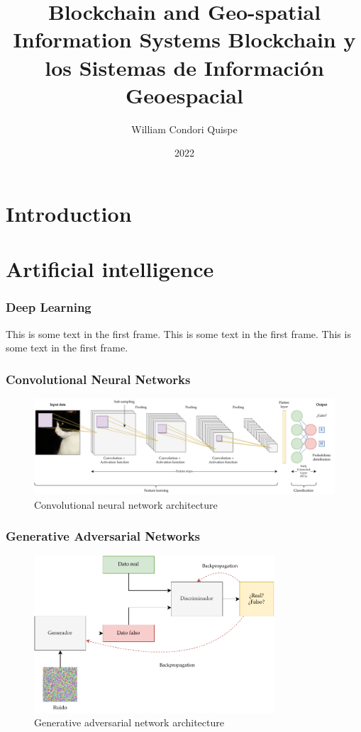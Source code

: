 \documentclass[8.5pt]{beamer}
\title[]{
Blockchain and Geo-spatial Information Systems 
\small{
Blockchain y los Sistemas de Información Geoespacial
}
}
\author{William Condori Quispe}
\institute{Unversidad Nacional Amazónica de Madre de Dios}
\date{2022}
\begin{document}
\maketitle

\section{Introduction}
\section{Artificial intelligence}

\begin{frame}
    \frametitle{Deep Learning}
    This is some text in the first frame. This is some text in the first frame. This is some text in the first frame.
\end{frame}

\begin{frame}
    \frametitle{Convolutional Neural Networks}
    \begin{figure}
        \centering
        \includegraphics[width=1\textwidth]{images/cnn.pdf}
        \caption{Convolutional neural network architecture}
        \label{fig:cnn}
    \end{figure}
\end{frame}

\begin{frame}
    \frametitle{Generative Adversarial Networks}
    \begin{figure}
        \centering
        \includegraphics[width=0.8\textwidth]{images/gan.pdf}
        \caption{Generative adversarial network architecture}
        \label{fig:gan}
    \end{figure}
\end{frame}
\end{document}

